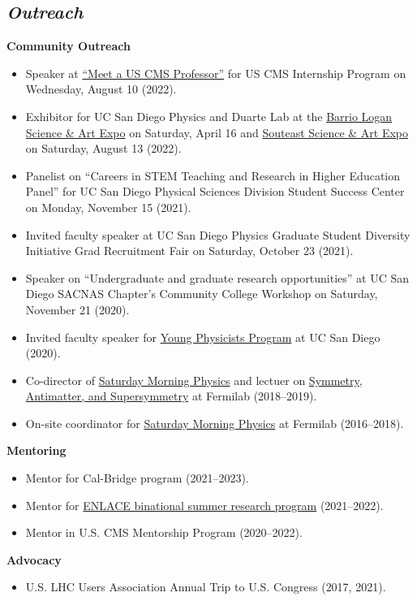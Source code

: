 \documentclass[11pt]{res}
\newcommand{\MarginText}[1]{\section{\textit{#1}}}
\begin{document}
\begin{resume}
  \MarginText{Outreach}
  \textbf{Community Outreach}
  \begin{itemize}
    \itemsep-0.3em
    \item Speaker at \href{https://indico.cern.ch/event/1167965/timetable/#93-meet-a-uscms-professorscien}{``Meet a US CMS Professor''} for US CMS Internship Program on Wednesday, August 10 (2022).
    \item Exhibitor for UC San Diego Physics and Duarte Lab at the \href{https://www.barriologansae.com/}{Barrio Logan Science \& Art Expo} on Saturday, April 16 and \href{https://www.southeastsdsteamexpo.com/}{Souteast Science \& Art Expo} on Saturday, August 13 ({2022}).
    \item Panelist on ``Careers in STEM Teaching and Research in Higher Education Panel'' for UC San Diego Physical Sciences Division Student Success Center on Monday, November 15 ({2021}).
    \item Invited faculty speaker at UC San Diego Physics Graduate Student Diversity Initiative Grad Recruitment Fair on Saturday, October 23 ({2021}).
    \item Speaker on ``Undergraduate and graduate research opportunities'' at UC San Diego SACNAS Chapter's Community College Workshop on Saturday, November 21 ({2020}).
    \item Invited faculty speaker for \href{http://ypp.ucsd.edu/}{Young Physicists Program} at UC San Diego ({2020}).
    \item Co-director of \href{http://saturdaymorningphysics.fnal.gov/}{Saturday Morning Physics} and lectuer on \href{http://saturdaymorningphysics.fnal.gov/fall-session-2018/}{Symmetry, Antimatter, and Supersymmetry} at Fermilab ({2018--2019}).
    \item On-site coordinator for \href{http://saturdaymorningphysics.fnal.gov/}{Saturday Morning Physics} at Fermilab ({2016--2018}).
  \end{itemize}

  \textbf{Mentoring}
  \begin{itemize}
    \itemsep-0.3em
    \item Mentor for Cal-Bridge program ({2021--2023}).
    \item Mentor for \href{http://resilientmaterials.ucsd.edu/ENLACE}{ENLACE binational summer research program} ({2021--2022}).
    \item Mentor in U.S. CMS Mentorship Program ({2020--2022}).
  \end{itemize}

  \textbf{Advocacy}
  \begin{itemize}
    \itemsep-0.3em
    \item U.S. LHC Users Association Annual Trip to U.S. Congress ({2017, 2021}).
  \end{itemize}


\end{resume}
\end{document}
